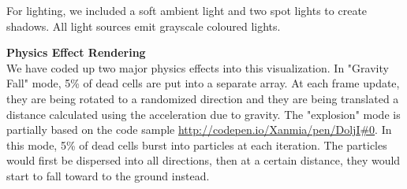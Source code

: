 \documentclass{article}
\begin{document}
For lighting, we included a soft ambient light and two spot lights to create shadows. All light sources emit grayscale coloured lights.

\textbf{Physics Effect Rendering}\\
We have coded up two major physics effects into this visualization. In "Gravity Fall" mode, 5\% of dead cells are put into a separate array. At each frame update, they are being rotated to a randomized direction and they are being translated a distance calculated using the acceleration due to gravity. The "explosion" mode is partially based on the code sample \url{http://codepen.io/Xanmia/pen/DoljI#0}. In this mode, 5\% of dead cells burst into particles at each iteration. The particles would first be dispersed into all directions, then at a certain distance, they would start to fall toward to the ground instead. 
\end{document}
